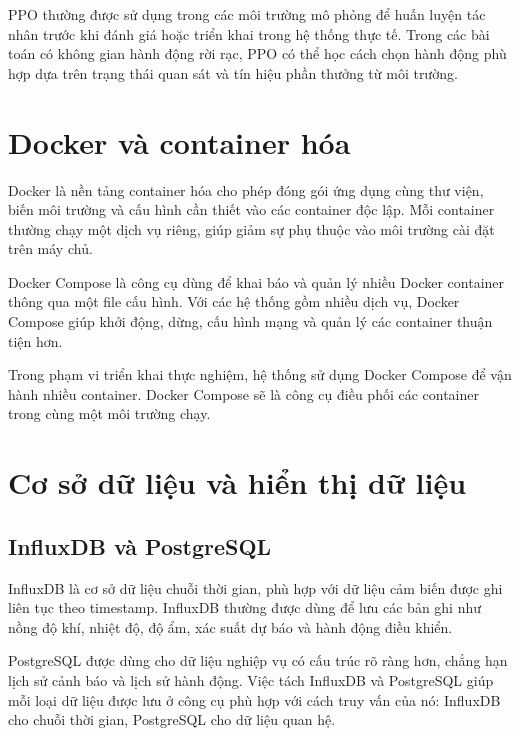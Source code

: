 PPO thường được sử dụng trong các môi trường mô phỏng để huấn luyện tác nhân trước khi đánh giá hoặc triển khai trong hệ thống thực tế. Trong các bài toán có không gian hành động rời rạc, PPO có thể học cách chọn hành động phù hợp dựa trên trạng thái quan sát và tín hiệu phần thưởng từ môi trường.

\section{Docker và container hóa}


Docker là nền tảng container hóa cho phép đóng gói ứng dụng cùng thư viện, biến môi trường và cấu hình cần thiết vào các container độc lập. Mỗi container thường chạy một dịch vụ riêng, giúp giảm sự phụ thuộc vào môi trường cài đặt trên máy chủ.

Docker Compose là công cụ dùng để khai báo và quản lý nhiều Docker container thông qua một file cấu hình. Với các hệ thống gồm nhiều dịch vụ, Docker Compose giúp khởi động, dừng, cấu hình mạng và quản lý các container thuận tiện hơn.

Trong phạm vi triển khai thực nghiệm, hệ thống sử dụng Docker Compose để vận hành nhiều container. Docker Compose sẽ là công cụ điều phối các container trong cùng một môi trường chạy.

\section{Cơ sở dữ liệu và hiển thị dữ liệu}

\subsection{InfluxDB và PostgreSQL}

InfluxDB là cơ sở dữ liệu chuỗi thời gian, phù hợp với dữ liệu cảm biến được ghi liên tục theo timestamp. InfluxDB thường được dùng để lưu các bản ghi như nồng độ khí, nhiệt độ, độ ẩm, xác suất dự báo và hành động điều khiển.


PostgreSQL được dùng cho dữ liệu nghiệp vụ có cấu trúc rõ ràng hơn, chẳng hạn lịch sử cảnh báo và lịch sử hành động. Việc tách InfluxDB và PostgreSQL giúp mỗi loại dữ liệu được lưu ở công cụ phù hợp với cách truy vấn của nó: InfluxDB cho chuỗi thời gian, PostgreSQL cho dữ liệu quan hệ.

